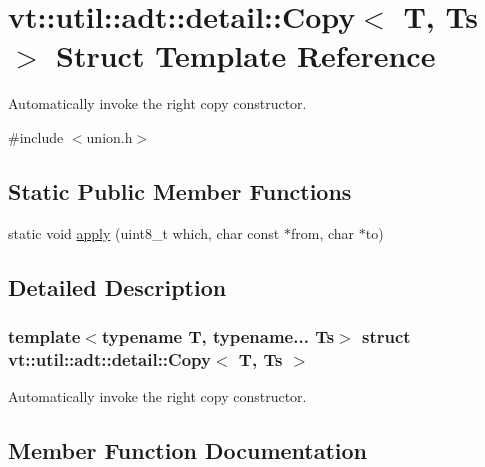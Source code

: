 \hypertarget{structvt_1_1util_1_1adt_1_1detail_1_1_copy}{}\section{vt\+:\+:util\+:\+:adt\+:\+:detail\+:\+:Copy$<$ T, Ts $>$ Struct Template Reference}
\label{structvt_1_1util_1_1adt_1_1detail_1_1_copy}


Automatically invoke the right copy constructor.  




{\ttfamily \#include $<$union.\+h$>$}

\subsection*{Static Public Member Functions}
\begin{DoxyCompactItemize}
\item 
static void \hyperlink{structvt_1_1util_1_1adt_1_1detail_1_1_copy_a03eaa0d0e724e67991338caad2345c67}{apply} (uint8\+\_\+t which, char const $\ast$from, char $\ast$to)
\end{DoxyCompactItemize}


\subsection{Detailed Description}
\subsubsection*{template$<$typename T, typename... Ts$>$\newline
struct vt\+::util\+::adt\+::detail\+::\+Copy$<$ T, Ts $>$}

Automatically invoke the right copy constructor. 

\subsection{Member Function Documentation}
\mbox{\label{structvt_1_1util_1_1adt_1_1detail_1_1_copy_a03eaa0d0e724e67991338caad2345c67}} 
